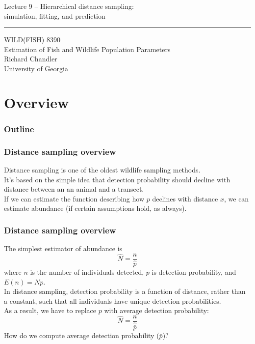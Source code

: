 \documentclass[color=usenames,dvipsnames]{beamer}\usepackage[]{graphicx}\usepackage[]{color}
\begin{document}
\begin{frame}[plain]
  \LARGE
  \centering
  {
    \LARGE Lecture 9 -- Hierarchical distance sampling: \\
    \Large simulation, fitting, and prediction %
  }
  {\color{default} \rule{\textwidth}{0.1pt} }
  \vfill
  \large
  WILD(FISH) 8390 \\
  Estimation of Fish and Wildlife Population Parameters \\
  \vfill
  \large
  Richard Chandler \\
  University of Georgia \\
\end{frame}






\section{Overview}



\begin{frame}[plain]
  \frametitle{Outline}
  \Large
\end{frame}



\begin{frame}
  \frametitle{Distance sampling overview}
  Distance sampling is one of the oldest wildlife sampling methods. \\
  \pause
  \vfill
  It's based on the simple idea that detection probability should
  decline with distance between an an animal and a transect. \\
  \pause
  \vfill
  If we can estimate the function describing how $p$ declines with
  distance $x$, we can estimate abundance \pause (if certain assumptions
  hold, as always). \\
\end{frame}



\begin{frame}
  \frametitle{Distance sampling overview}
  The simplest estimator of abundance is 
  \[
    \hat{N} = \frac{n}{\hat{p}}
  \]
  where $n$ is the number of individuals detected, $p$ is detection
  probability, and $E(n)=Np$. \\
  \pause
  \vfill
  In distance sampling, detection probability is a \alert{function} of
  distance, rather than a constant, such that all individuals have
  unique detection probabilities. \\
  \pause
  \vfill
  As a result, we have to replace
  $p$ with \alert{average} detection probability:
  \[
    \hat{N} = \frac{n}{\hat{\bar{p}}}
  \]
  \pause
  \vfill
  How do we compute average detection probability ($\bar{p}$)?
\end{frame}
\end{document}
